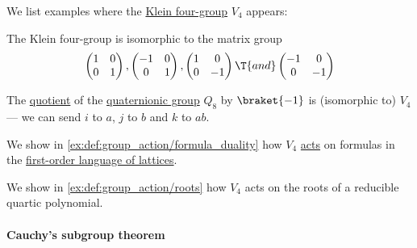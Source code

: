 \begin{example}\label{ex:def:klein_four_group}
  We list examples where the \hyperref[def:klein_four_group]{Klein four-group} \( V_4 \) appears:
  \begin{thmenum}
     The Klein four-group is isomorphic to the matrix group
    \begin{equation}\label{eq:ex:def:klein_four_group/2x2_matrices}
      \begin{pmatrix}
        1 & 0 \\
        0 & 1
      \end{pmatrix}
      ,
      \begin{pmatrix}
        -1 & 0 \\
        0  & 1
      \end{pmatrix}
      ,
      \begin{pmatrix}
        1 & 0 \\
        0 & -1
      \end{pmatrix}
      \T{and}
      \begin{pmatrix}
        -1 & 0 \\
        0  & -1
      \end{pmatrix}
    \end{equation}

     The \hyperref[def:group/quotient]{quotient} of the \hyperref[def:quaternionic_group]{quaternionic group} \( Q_8 \) by \( \braket{ -1 } \) is (isomorphic to) \( V_4 \) --- we can send \( i \) to \( a \), \( j \) to \( b \) and \( k \) to \( ab \).

     We show in \cref{ex:def:group_action/formula_duality} how \( V_4 \) \hyperref[def:group_action]{acts} on formulas in the \hyperref[def:lattice/theory]{first-order language of lattices}.

     We show in \cref{ex:def:group_action/roots} how \( V_4 \) acts on the roots of a reducible quartic polynomial.
  \end{thmenum}
\end{example}

\paragraph{Cauchy's subgroup theorem}


